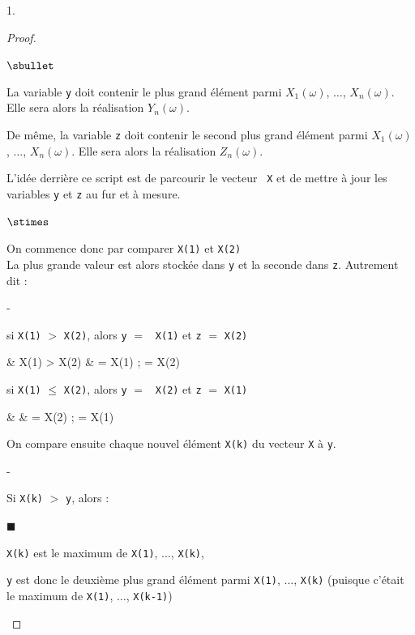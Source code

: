 \documentclass[11pt]{article}%
\begin{document}
\begin{noliste}{1.}
\begin{proof}
\begin{noliste}{$\sbullet$}
      \item La variable {\tt y} doit contenir le plus grand 
      élément parmi $X_1(\omega)$, $\ldots$, $X_n(\omega)$. Elle 
      sera alors la réalisation $Y_n(\omega)$.
      
      \item De même, la variable {\tt z} doit contenir le second plus 
      grand élément parmi $X_1(\omega)$, $\ldots$, $X_n(\omega)$.
      Elle sera alors la réalisation $Z_n(\omega)$.
      
      \item L'idée derrière ce script est de parcourir le vecteur {\tt 
      X}
      et de mettre à jour les variables {\tt y} et {\tt z} au fur et 
      à mesure.
      \begin{noliste}{$\stimes$}
	\item On commence donc par comparer {\tt X(1)} et {\tt X(2)}\\
	La plus grande valeur est alors stockée dans {\tt y} et la 
	seconde dans {\tt z}. Autrement dit :
	\begin{noliste}{-}
	  \item si {\tt X(1)} $>$ {\tt X(2)}, alors {\tt y} $=$ {\tt
	  X(1)} et {\tt z} $=$ {\tt X(2)}
	  \begin{scilabC}{2}
	    & \quad {} X(1) > X(2) \nl %
	    & \quad \quad {} = X(1) ;  = X(2)
	  \end{scilabC}
	  
	  \item si {\tt X(1)} $\leq$ {\tt X(2)}, alors {\tt y} $=$ {\tt
	  X(2)} et {\tt z} $=$ {\tt X(1)}
	  \begin{scilabC}{4}
	    & \quad {} \nl %
	    & \quad \quad {} = X(2) ;  = X(1)
	  \end{scilabC}
	\end{noliste}
	
	\item On compare ensuite chaque nouvel élément {\tt X(k)} 
	du vecteur {\tt X} à {\tt y}.
	\begin{noliste}{-}
	  \item Si {\tt X(k)} $>$ {\tt y}, alors :
	\end{noliste}
	  \begin{liste}{\tiny$\blacksquare$}
	    \item {\tt X(k)} est le maximum de {\tt X(1)}, $\ldots$,
	    {\tt X(k)},
	    
	    \item {\tt y} est donc le deuxième plus grand élément 
	    parmi {\tt X(1)}, $\ldots$, {\tt X(k)} (puisque c'était 
	    le maximum de {\tt X(1)}, $\ldots$, {\tt X(k-1)})
	    

\end{liste}
\end{noliste}
\end{noliste}
\end{proof}
\end{noliste}
\end{document}
